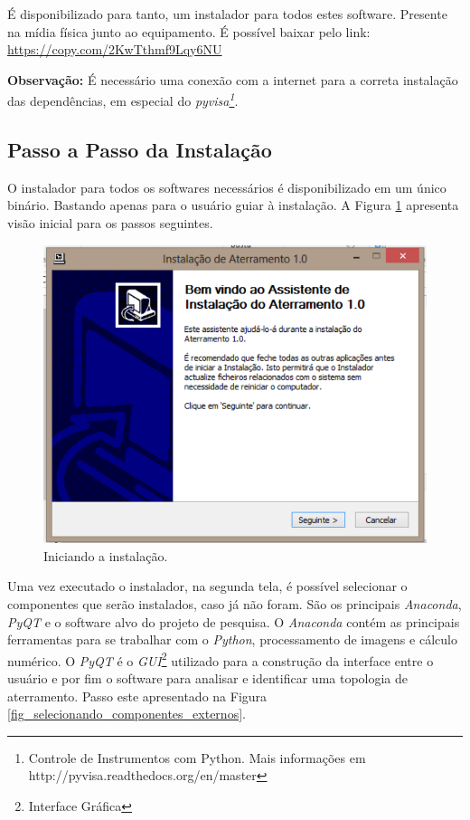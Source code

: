 \documentclass[a4paper, 10pt]{article}
\begin{document}
É disponibilizado para tanto, um instalador para todos estes software. Presente 
na mídia física junto ao equipamento. 
É possível baixar pelo link: 
\url{https://copy.com/2KwTthmf9Lqy6NU}

\textbf{Observação:} É necessário uma conexão com a internet para a correta 
instalação das dependências, em especial do  \textit{pyvisa\footnote{Controle de Instrumentos com Python. Mais informações em http://pyvisa.readthedocs.org/en/master}}.


\subsection{Passo a Passo da Instalação}

O instalador para todos os softwares necessários é disponibilizado em um único
binário. Bastando apenas para o usuário guiar à instalação. A Figura \ref{fig_iniciando_instalacao} apresenta visão inicial para os passos seguintes.

\begin{figure}[!h]
        \caption{\label{fig_iniciando_instalacao}Iniciando a instalação.}
	    \begin{center}
            \includegraphics[scale=0.7]{../fotos/instalacao/parte1_executando.pdf}
	    \end{center}
\end{figure}

Uma vez executado o instalador, na segunda tela, é possível selecionar o componentes 
que serão instalados, caso já não foram. São os principais \textit{Anaconda}, \textit{PyQT} e o software
alvo do projeto de pesquisa. O \textit{Anaconda} contém as principais ferramentas para se
trabalhar com o \textit{Python}, processamento de imagens e cálculo numérico. O \textit{PyQT} é 
o \textit{GUI}\footnote{Interface Gráfica} utilizado para a construção da interface entre o usuário e por fim 
o software para analisar e identificar uma topologia de aterramento. Passo este apresentado 
na Figura \ref{fig_selecionando_componentes_externos}. 
\end{document}
